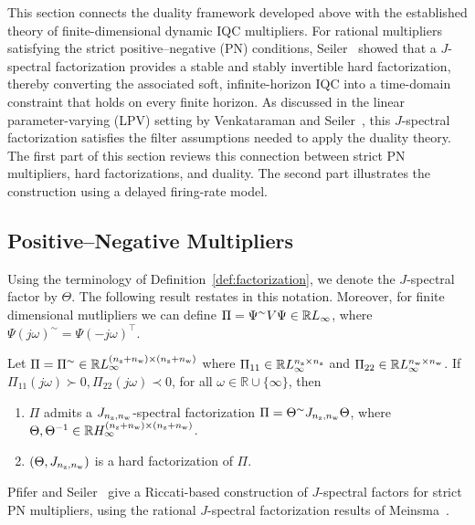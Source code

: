 
This section connects the duality framework developed above with
the established theory of finite-dimensional dynamic IQC multipliers. For
rational multipliers satisfying the strict positive--negative (PN)
conditions, Seiler~\cite{6915700} showed that a $J$-spectral factorization
provides a stable and stably invertible hard factorization, thereby converting
the associated soft, infinite-horizon IQC into a time-domain constraint that
holds on every finite horizon. As discussed in the linear parameter-varying (LPV) setting by Venkataraman and
Seiler~\cite{venkataraman}, this $J$-spectral factorization satisfies the filter
assumptions needed to apply the duality theory. The first part of this section
reviews this connection between strict PN multipliers, hard factorizations,
and duality. The second part illustrates the construction using a delayed
firing-rate model.
\subsection{Positive--Negative Multipliers}

Using the terminology of Definition~\ref{def:factorization}, we denote the
$J$-spectral factor by $\Theta$. The following result restates
\cite[Thm.~4]{6915700} in this notation. Moreover, for finite dimensional mutlipliers we can
define $\Pi = \Psi^\sim V\Psi\in\mathbb{R} L_\infty$, where $\Psi(j\omega)^\sim = \Psi(-j\omega)^\top$.
\begin{theorem}\label{thm:strict-pn-j-spectral}
Let $\Pi=\Pi^\sim\in\mathbb{R} L_\infty^{(n_{{\mathrm{z}}}+n_{{\mathrm{w}}})\times(n_{{\mathrm{z}}}+n_{{\mathrm{w}}})}$
where $\Pi_{11}\in\mathbb{R} L_\infty^{n_{{\mathrm{z}}}\times n_{{\mathrm{z}}}}$ and
$\Pi_{22}\in\mathbb{R} L_\infty^{n_{{\mathrm{w}}}\times n_{{\mathrm{w}}}}$. If $\Pi_{11}(j\omega)\succ0$,\,$\Pi_{22}(j\omega)\prec0$,
for all $\omega\in\mathbb{R}\cup\{\infty\}$,
then
\begin{enumerate}
    \item $\Pi$ admits a $J_{n_{{\mathrm{z}}},n_{{\mathrm{w}}}}$-spectral factorization
          $\Pi=\Theta^\sim J_{n_{{\mathrm{z}}},n_{{\mathrm{w}}}}\Theta$, where
          $\Theta,\Theta^{-1}\in
          \mathbb{R} H_\infty^{(n_{{\mathrm{z}}}+n_{{\mathrm{w}}})\times(n_{{\mathrm{z}}}+n_{{\mathrm{w}}})}$.
    \item $(\Theta,J_{n_{{\mathrm{z}}},n_{{\mathrm{w}}}})$ is a hard factorization of $\Pi$.
\end{enumerate}
\end{theorem}
Pfifer and Seiler~\cite[App.~B]{Pfifer2015} give a Riccati-based construction
of $J$-spectral factors for strict PN multipliers, using the rational
$J$-spectral factorization results of Meinsma~\cite{MEINSMA1995243}.

